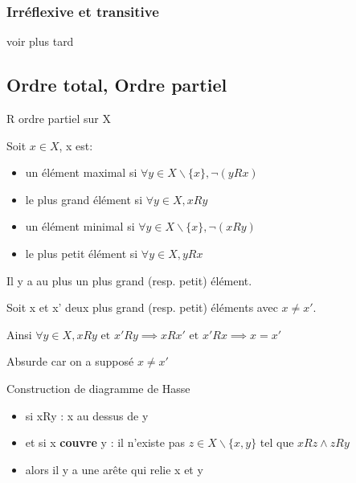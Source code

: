 \documentclass[a4paper, 12pt]{article}
\begin{document}
\subsubsection{Irréflexive et transitive}

voir plus tard






\subsection{Ordre total, Ordre partiel}

R ordre partiel sur X

Soit $x \in X$, x est:

\begin{itemize}
    \item un élément maximal si $\forall y \in X\backslash\{x\}, \neg (yRx)$
    \item le plus grand élément si $\forall y \in X, xRy$
    \item un élément minimal si $\forall y \in X\backslash\{x\}, \neg (xRy)$
    \item le plus petit élément si $\forall y \in X, yRx$
\end{itemize}

\begin{proposition}
    Il y a au plus un plus grand (resp. petit) élément.
\end{proposition}

\begin{demonstration}
    Soit x et x' deux plus grand (resp. petit) éléments avec $x \neq x'$.

    Ainsi $\forall y \in X, xRy \text{ et } x'Ry \implies xRx' \text{ et } x'Rx \implies x = x'$

    Absurde car on a supposé $x \neq x'$
\end{demonstration}

Construction de diagramme de Hasse
\begin{itemize}
    \item si xRy : x au dessus de y
    \item et si x \textbf{couvre} y : il n'existe pas $z \in X\backslash\{x, y\}$ tel que $xRz \land zRy$
    \item alors il y a une arête qui relie x et y
\end{itemize}
\end{document}
